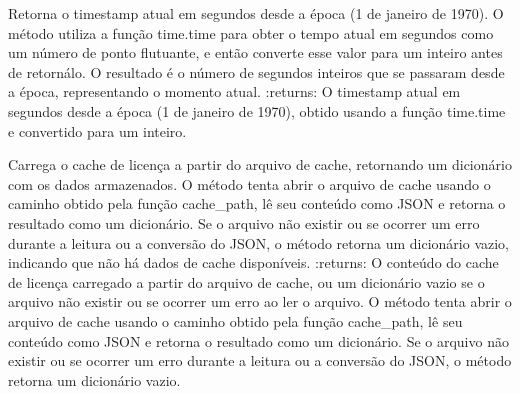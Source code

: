 \documentclass[letterpaper,10pt,english]{sphinxmanual}
\begin{document}

\begin{fulllineitems}
\label{\detokenize{api/online_license:online_license.now_ts}}
\pysigstartsignatures
\pysiglinewithargsret
{}
{}
{}
\pysigstopsignatures
\sphinxAtStartPar
Retorna o timestamp atual em segundos desde a época (1 de janeiro de 1970). O método utiliza a função time.time para obter o tempo atual em segundos como um número de ponto flutuante, e então converte esse valor para um inteiro antes de retorná\sphinxhyphen{}lo. O resultado é o número de segundos inteiros que se passaram desde a época, representando o momento atual.
:returns: O timestamp atual em segundos desde a época (1 de janeiro de 1970), obtido usando a função time.time e convertido para um inteiro.
\begin{quote}\begin{description}
\sphinxAtStartPar
{}

\end{description}\end{quote}

\end{fulllineitems}


\begin{fulllineitems}
\label{\detokenize{api/online_license:online_license.load_cache}}
\pysigstartsignatures
\pysiglinewithargsret
{}
{}
{}
\pysigstopsignatures
\sphinxAtStartPar
Carrega o cache de licença a partir do arquivo de cache, retornando um dicionário com os dados armazenados. O método tenta abrir o arquivo de cache usando o caminho obtido pela função cache\_path, lê seu conteúdo como JSON e retorna o resultado como um dicionário. Se o arquivo não existir ou se ocorrer um erro durante a leitura ou a conversão do JSON, o método retorna um dicionário vazio, indicando que não há dados de cache disponíveis.
:returns: O conteúdo do cache de licença carregado a partir do arquivo de cache, ou um dicionário vazio se o arquivo não existir ou se ocorrer um erro ao ler o arquivo. O método tenta abrir o arquivo de cache usando o caminho obtido pela função cache\_path, lê seu conteúdo como JSON e retorna o resultado como um dicionário. Se o arquivo não existir ou se ocorrer um erro durante a leitura ou a conversão do JSON, o método retorna um dicionário vazio.
\begin{quote}\begin{description}
\sphinxAtStartPar
{}

\end{description}\end{quote}

\end{fulllineitems}
\end{document}
